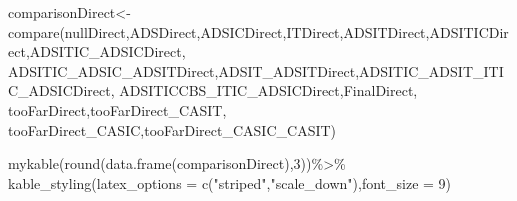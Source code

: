 \documentclass[
  10pt,
  dvipsnames,enabledeprecatedfontcommands]{scrartcl}
\newenvironment{Shaded}{\begin{snugshade}}{\end{snugshade}}
\newcommand{\AttributeTok}[1]{\textcolor[rgb]{0.77,0.63,0.00}{#1}}
\newcommand{\DecValTok}[1]{\textcolor[rgb]{0.00,0.00,0.81}{#1}}
\newcommand{\FunctionTok}[1]{\textcolor[rgb]{0.00,0.00,0.00}{#1}}
\newcommand{\NormalTok}[1]{#1}
\newcommand{\OtherTok}[1]{\textcolor[rgb]{0.56,0.35,0.01}{#1}}
\newcommand{\SpecialCharTok}[1]{\textcolor[rgb]{0.00,0.00,0.00}{#1}}
\newcommand{\StringTok}[1]{\textcolor[rgb]{0.31,0.60,0.02}{#1}}
\begin{document}
\begin{Shaded}
\begin{Highlighting}[]
\NormalTok{comparisonDirect}\OtherTok{\textless{}{-}} \FunctionTok{compare}\NormalTok{(nullDirect,ADSDirect,ADSICDirect,ITDirect,ADSITDirect,ADSITICDirect,ADSITIC\_ADSICDirect, ADSITIC\_ADSIC\_ADSITDirect,ADSIT\_ADSITDirect,ADSITIC\_ADSIT\_ITIC\_ADSICDirect,}
\NormalTok{                     ADSITICCBS\_ITIC\_ADSICDirect,FinalDirect, tooFarDirect,tooFarDirect\_CASIT,}
\NormalTok{                     tooFarDirect\_CASIC,tooFarDirect\_CASIC\_CASIT)}


\FunctionTok{mykable}\NormalTok{(}\FunctionTok{round}\NormalTok{(}\FunctionTok{data.frame}\NormalTok{(comparisonDirect),}\DecValTok{3}\NormalTok{))}\SpecialCharTok{\%\textgreater{}\%} \FunctionTok{kable\_styling}\NormalTok{(}\AttributeTok{latex\_options =} \FunctionTok{c}\NormalTok{(}\StringTok{"striped"}\NormalTok{,}\StringTok{"scale\_down"}\NormalTok{),}\AttributeTok{font\_size =} \DecValTok{9}\NormalTok{)  }
\end{Highlighting}
\end{Shaded}
\end{document}
